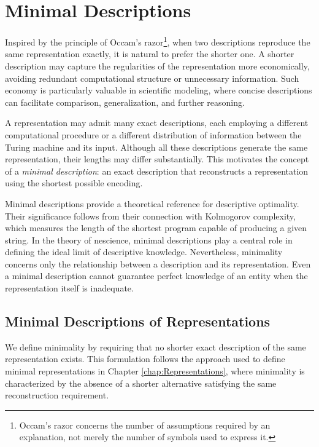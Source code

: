 %
%

\section{Minimal Descriptions}
\label{sec:minimal_descriptions}

Inspired by the principle of Occam's razor\footnote{Occam's razor concerns the number of assumptions required by an explanation, not merely the number of symbols used to express it.}, when two descriptions reproduce the same representation exactly, it is natural to prefer the shorter one. A shorter description may capture the regularities of the representation more economically, avoiding redundant computational structure or unnecessary information. Such economy is particularly valuable in scientific modeling, where concise descriptions can facilitate comparison, generalization, and further reasoning.

A representation may admit many exact descriptions, each employing a different computational procedure or a different distribution of information between the Turing machine and its input. Although all these descriptions generate the same representation, their lengths may differ substantially. This motivates the concept of a \emph{minimal description}: an exact description that reconstructs a representation using the shortest possible encoding.

Minimal descriptions provide a theoretical reference for descriptive optimality. Their significance follows from their connection with Kolmogorov complexity, which measures the length of the shortest program capable of producing a given string. In the theory of nescience, minimal descriptions play a central role in defining the ideal limit of descriptive knowledge. Nevertheless, minimality concerns only the relationship between a description and its representation. Even a minimal description cannot guarantee perfect knowledge of an entity when the representation itself is inadequate.


\subsection*{Minimal Descriptions of Representations}

We define minimality by requiring that no shorter exact description of the same representation exists. This formulation follows the approach used to define minimal representations in Chapter \ref{chap:Representations}, where minimality is characterized by the absence of a shorter alternative satisfying the same reconstruction requirement.

